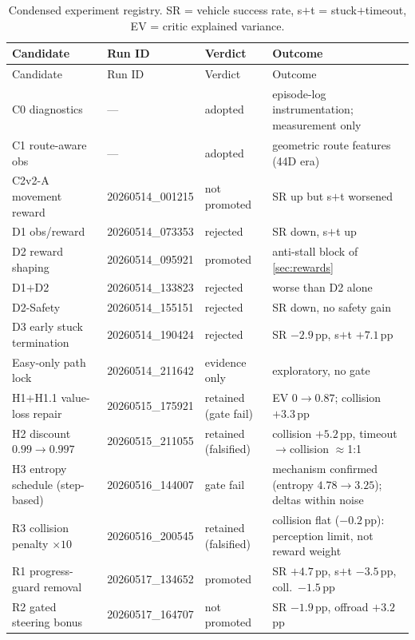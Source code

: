 \begin{small}
\begin{longtable}{@{}p{3.1cm}p{2.8cm}p{2.0cm}p{5.6cm}@{}}
  \caption{Condensed experiment registry. SR = vehicle success rate,
  s$+$t = stuck$+$timeout, EV = critic explained variance.}
  \label{tab:registry}\\
  \toprule
  Candidate & Run ID & Verdict & Outcome \\
  \midrule
  \endfirsthead
  \toprule
  Candidate & Run ID & Verdict & Outcome \\
  \midrule
  \endhead
  C0 diagnostics & --- & adopted & episode-log instrumentation; measurement only \\
  C1 route-aware obs & --- & adopted & geometric route features (44D era) \\
  C2v2-A movement reward & 20260514\_001215 & not promoted & SR up but s$+$t worsened \\
  D1 obs/reward & 20260514\_073353 & rejected & SR down, s$+$t up \\
  D2 reward shaping & 20260514\_095921 & promoted & anti-stall block of \cref{sec:rewards} \\
  D1$+$D2 & 20260514\_133823 & rejected & worse than D2 alone \\
  D2-Safety & 20260514\_155151 & rejected & SR down, no safety gain \\
  D3 early stuck termination & 20260514\_190424 & rejected & SR $-2.9$\,pp, s$+$t $+7.1$\,pp \\
  Easy-only path lock & 20260514\_211642 & evidence only & exploratory, no gate \\
  H1$+$H1.1 value-loss repair & 20260515\_175921 & retained (gate fail) & EV $0 \to 0.87$; collision $+3.3$\,pp \\
  H2 discount $0.99 \to 0.997$ & 20260515\_211055 & retained (falsified) & collision $+5.2$\,pp, timeout$\to$collision $\approx$1:1 \\
  H3 entropy schedule (step-based) & 20260516\_144007 & gate fail & mechanism confirmed (entropy $4.78 \to 3.25$); deltas within noise \\
  R3 collision penalty $\times 10$ & 20260516\_200545 & retained (falsified) & collision flat ($-0.2$\,pp): perception limit, not reward weight \\
  R1 progress-guard removal & 20260517\_134652 & promoted & SR $+4.7$\,pp, s$+$t $-3.5$\,pp, coll.\ $-1.5$\,pp \\
  R2 gated steering bonus & 20260517\_164707 & not promoted & SR $-1.9$\,pp, offroad $+3.2$\,pp \\

\end{longtable}
\end{small}
